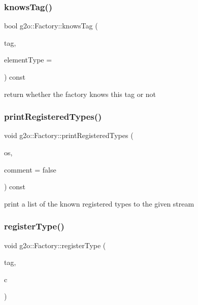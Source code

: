 \subsubsection{\texorpdfstring{knows\+Tag()}{knowsTag()}}
{\footnotesize\ttfamily bool g2o\+::\+Factory\+::knows\+Tag (\begin{DoxyParamCaption}\item[{const std\+::string \&}]{tag,  }\item[{int $\ast$}]{element\+Type = {} }\end{DoxyParamCaption}) const}

return whether the factory knows this tag or not \mbox{\label{classg2o_1_1_factory_a564b37b3ccbdd559a386b40ca16d219b}} 
\subsubsection{\texorpdfstring{print\+Registered\+Types()}{printRegisteredTypes()}}
{\footnotesize\ttfamily void g2o\+::\+Factory\+::print\+Registered\+Types (\begin{DoxyParamCaption}\item[{std\+::ostream \&}]{os,  }\item[{bool}]{comment = {\ttfamily false} }\end{DoxyParamCaption}) const}

print a list of the known registered types to the given stream \mbox{\label{classg2o_1_1_factory_aba2f2e40635fd1b996981cefdb65c346}} 
\subsubsection{\texorpdfstring{register\+Type()}{registerType()}}
{\footnotesize\ttfamily void g2o\+::\+Factory\+::register\+Type (\begin{DoxyParamCaption}\item[{const std\+::string \&}]{tag,  }\item[{\mbox{\hyperlink{classg2o_1_1_abstract_hyper_graph_element_creator}{Abstract\+Hyper\+Graph\+Element\+Creator}} $\ast$}]{c }\end{DoxyParamCaption})}

